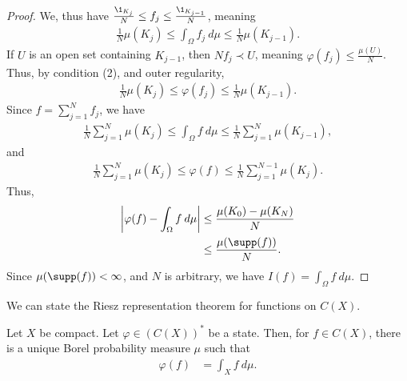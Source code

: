 \documentclass[10pt]{mypackage}
\begin{document}
\begin{proof}
  We, thus have $\frac{\1_{K_j}}{N} \leq f_j \leq \frac{\1_{K_{j-1}}}{N}$, meaning
  \begin{align*}
    \frac{1}{N}\mu\!\left(K_j\right) \leq \int_{\Omega}f_j\:d\mu \leq \frac{1}{N}\mu\!\left(K_{j-1}\right).
  \end{align*}
  If $U$ is an open set containing $K_{j-1}$, then $Nf_{j} \prec U$, meaning $\varphi\left(f_j\right) \leq \frac{\mu\!\left(U\right)}{N}$. Thus, by condition (2), and outer regularity,
  \begin{align*}
    \frac{1}{N}\mu\!\left(K_{j}\right) \leq \varphi\left(f_j\right) \leq \frac{1}{N}\mu\!\left(K_{j-1}\right).
  \end{align*}
  Since $f = \sum_{j=1}^{N} f_j$, we have
  \begin{align*}
    \frac{1}{N}\sum_{j=1}^{N}\mu\!\left(K_j\right) \leq \int_{\Omega}f\:d\mu \leq \frac{1}{N}\sum_{j=1}^{N}\mu\!\left(K_{j-1}\right),
  \end{align*}
  and
  \begin{align*}
    \frac{1}{N}\sum_{j=1}^{N}\mu\!\left(K_j\right) \leq \varphi(f)\leq \frac{1}{N}\sum_{j=1}^{N-1}\mu\!\left(K_j\right).
  \end{align*}
  Thus,
  \begin{align*}
    \left\vert \varphi(f) - \int_{\Omega}f\:d\mu \right\vert &\leq \frac{\mu\!\left(K_0\right) - \mu\!\left(K_{N}\right)}{N}\\
    &\leq \frac{\mu\!\left(\supp(f)\right)}{N}.
  \end{align*}
  Since $\mu\!\left(\supp(f)\right) < \infty$, and $N$ is arbitrary, we have $I(f) = \int_{\Omega}f\:d\mu$.
\end{proof}
We can state the Riesz representation theorem for functions on $C(X)$.
\begin{theorem}
  Let $X$ be compact. Let $\varphi\in \left(C(X)\right)^{\ast}$ be a state. Then, for $f\in C(X)$, there is a unique Borel probability measure $\mu$ such that
  \begin{align*}
    \varphi(f) &= \int_{X} f\:d\mu.
  \end{align*}
\end{theorem}
\end{document}
